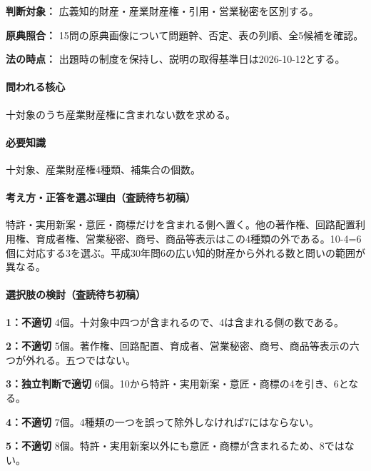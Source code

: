 \noindent\textbf{判断対象：} 広義知的財産・産業財産権・引用・営業秘密を区別する。\par

\noindent\textbf{原典照合：} 15問の原典画像について問題幹、否定、表の列順、全5候補を確認。\par

\noindent\textbf{法の時点：} 出題時の制度を保持し、説明の取得基準日は2026-10-12とする。\par

\paragraph{問われる核心} 十対象のうち産業財産権に含まれない数を求める。

\paragraph{必要知識} 十対象、産業財産権4種類、補集合の個数。

\paragraph{考え方・正答を選ぶ理由（査読待ち初稿）} 特許・実用新案・意匠・商標だけを含まれる側へ置く。他の著作権、回路配置利用権、育成者権、営業秘密、商号、商品等表示はこの4種類の外である。10-4=\allowbreak{}6個に対応する3を選ぶ。平成30年問6の広い知的財産から外れる数と問いの範囲が異なる。

\paragraph{選択肢の検討（査読待ち初稿）}\mbox{}\par

\noindent\textbf{1：不適切} 4個。十対象中四つが含まれるので、4は含まれる側の数である。\par

\noindent\textbf{2：不適切} 5個。著作権、回路配置、育成者、営業秘密、商号、商品等表示の六つが外れる。五つではない。\par

\noindent\textbf{3：独立判断で適切} 6個。10から特許・実用新案・意匠・商標の4を引き、6となる。\par

\noindent\textbf{4：不適切} 7個。4種類の一つを誤って除外しなければ7にはならない。\par

\noindent\textbf{5：不適切} 8個。特許・実用新案以外にも意匠・商標が含まれるため、8ではない。\par

